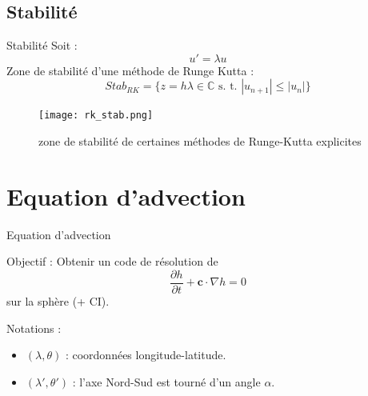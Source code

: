 \documentclass[11pt]{beamer}
\begin{document}
\subsection{Stabilité}
\begin{frame}{Stabilité}
Soit :
$$u' = \lambda u$$
Zone de stabilité d'une méthode de Runge Kutta :
$$Stab_{RK} = \lbrace z = h \lambda \in \mathbb{C} \text{ s. t. }
| u_{n+1} | \leq | u_n | \rbrace $$

\begin{figure}
\begin{center}
\texttt{[image: rk\_stab.png]}
\caption{zone de stabilité de certaines méthodes de Runge-Kutta explicites}
\end{center}
\end{figure}

\end{frame}



\section{Equation d'advection}
\begin{frame}{Equation d'advection}
\begin{block}{Objectif :}
Obtenir un code de résolution de 
$$\dfrac{\partial h}{\partial t} + \mathbf{c} \cdot \nabla h = 0$$
sur la sphère (+ CI).
\end{block}

Notations : 
\begin{itemize}
\item $(\lambda, \theta)$ : coordonnées longitude-latitude.
\item $(\lambda', \theta')$ : l'axe Nord-Sud est tourné d'un angle $\alpha$.
\end{itemize}
\end{frame}
\end{document}
